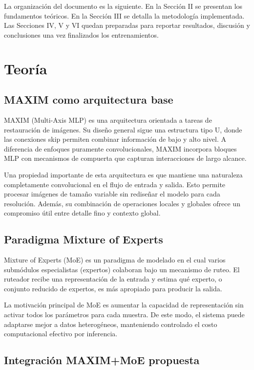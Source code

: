 \documentclass[aps,prl,twocolumn,groupedaddress]{revtex4-2}
\begin{document}
La organización del documento es la siguiente. En la Sección II se presentan los fundamentos teóricos. En la Sección III se detalla la metodología implementada. Las Secciones IV, V y VI quedan preparadas para reportar resultados, discusión y conclusiones una vez finalizados los entrenamientos.

\section{Teoría}

\subsection{MAXIM como arquitectura base}

MAXIM (Multi-Axis MLP) es una arquitectura orientada a tareas de restauración de imágenes. Su diseño general sigue una estructura tipo U, donde las conexiones skip permiten combinar información de bajo y alto nivel. A diferencia de enfoques puramente convolucionales, MAXIM incorpora bloques MLP con mecanismos de compuerta que capturan interacciones de largo alcance.

Una propiedad importante de esta arquitectura es que mantiene una naturaleza completamente convolucional en el flujo de entrada y salida. Esto permite procesar imágenes de tamaño variable sin rediseñar el modelo para cada resolución. Además, su combinación de operaciones locales y globales ofrece un compromiso útil entre detalle fino y contexto global.

\subsection{Paradigma Mixture of Experts}

Mixture of Experts (MoE) es un paradigma de modelado en el cual varios submódulos especialistas (expertos) colaboran bajo un mecanismo de ruteo. El ruteador recibe una representación de la entrada y estima qué experto, o conjunto reducido de expertos, es más apropiado para producir la salida.

La motivación principal de MoE es aumentar la capacidad de representación sin activar todos los parámetros para cada muestra. De este modo, el sistema puede adaptarse mejor a datos heterogéneos, manteniendo controlado el costo computacional efectivo por inferencia.

\subsection{Integración MAXIM+MoE propuesta}
\end{document}
